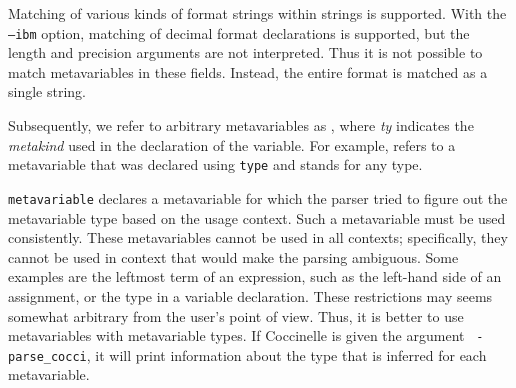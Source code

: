 Matching of various kinds of format strings within strings is supported.
With the {\tt --ibm} option, matching of decimal format declarations is
supported, but the length and precision arguments are not interpreted.
Thus it is not possible to match metavariables in these fields.  Instead,
the entire format is matched as a single string.

\begin{grammar}


    







\end{grammar}

Subsequently, we refer to arbitrary metavariables as
, where {\it{ty}}
indicates the {\it metakind} used in the declaration of the variable.
For example,  refers to a metavariable
that was declared using \texttt{type} and stands for any type.

{\tt metavariable} declares a metavariable for which the parser tried to
figure out the metavariable type based on the usage context.  Such a
metavariable must be used consistently.  These metavariables cannot be used
in all contexts; specifically, they cannot be used in context that would
make the parsing ambiguous.  Some examples are the leftmost term of an
expression, such as the left-hand side of an assignment, or the type in a
variable declaration.  These restrictions may seems somewhat arbitrary from
the user's point of view.  Thus, it is better to use metavariables with
metavariable types.  If Coccinelle is given the argument {\tt
  -parse\_cocci}, it will print information about the type that is inferred
for each metavariable.


